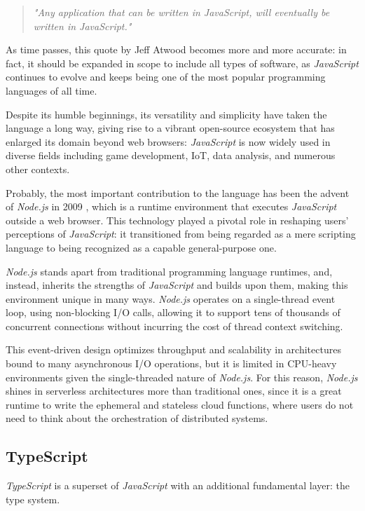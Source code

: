 \begin{quote}
  \textit{"Any application that can be written in JavaScript, will eventually be written in JavaScript."}
\end{quote}

As time passes, this quote by Jeff Atwood becomes more and more accurate:
in fact, it should be expanded in scope to include all types of software,
as \textit{JavaScript} continues to evolve and keeps being one of the most
popular programming languages of all time.

Despite its humble beginnings, its versatility and simplicity
have taken the language a long way, giving rise to a vibrant open-source ecosystem
that has enlarged its domain beyond web browsers:
\textit{JavaScript} is now widely used in diverse fields including
game development, IoT, data analysis, and numerous other contexts.

Probably, the most important contribution to the language has been
the advent of \textit{Node.js} in 2009 \cite{node}, which is a runtime environment
that executes \textit{JavaScript} outside a web browser.
This technology played a pivotal role in reshaping users' perceptions of \textit{JavaScript}:
it transitioned from being regarded as a mere scripting language
to being recognized as a capable general-purpose one.

\textit{Node.js} stands apart from traditional programming language runtimes,
and, instead, inherits the strengths of \textit{JavaScript} and builds upon them,
making this environment unique in many ways.
\textit{Node.js} operates on a single-thread event loop,
using non-blocking I/O calls, allowing it to support tens of thousands
of concurrent connections without incurring the cost of thread context switching.

This event-driven design optimizes throughput and scalability in architectures
bound to many asynchronous I/O operations, but it is limited in CPU-heavy environments
given the single-threaded nature of \textit{Node.js}.
For this reason, \textit{Node.js} shines in serverless architectures more than
traditional ones, since it is a great runtime to write the ephemeral and stateless
cloud functions, where users do not need to think about the orchestration of distributed systems.

\subsection{TypeScript}

\textit{TypeScript} is a superset of \textit{JavaScript} with an additional fundamental layer: the type system.

